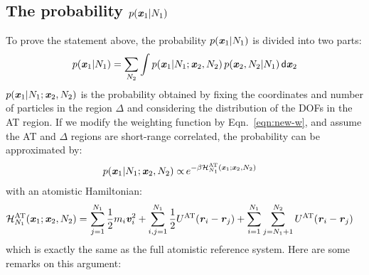 \documentclass[aip,jcp,a4paper,reprint,onecolumn]{revtex4-1}
\newcommand{\vect}[1]{\textbf{\textit{#1}}}
\newcommand{\dd}[1]{\textsf{#1}}
\newcommand{\AT}{{\textrm{{AT}}}}
\newcommand{\HY}{{\Delta}}
\begin{document}
\subsection{The probability $p(\vect x_1 | N_1)$}
To prove the statement above, the probability $p(\vect x_1 | N_1)$ is divided into two parts:
\begin{align}\label{eqn:divide-cond-p}
  p(\vect x_1 | N_1) = \sum_{N_2}\int
  p(\vect x_1 | N_1; \vect x_2, N_2) \,
  p(\vect x_2, N_2 | N_1)
  \,\dd d\vect x_2
\end{align}
$p(\vect x_1 | N_1; \vect x_2, N_2)$ is the probability obtained by fixing the
coordinates and number of particles in the region $\HY$ and considering
the distribution of the DOFs in the AT region.
  If we modify the weighting function by Eqn.~\eqref{eqn:new-w},
and assume the AT and $\HY$ regions are short-range correlated,
the probability can be approximated by:
\begin{align}\label{eqn:p-1-1}
  p(\vect x_1 | N_1; \vect x_2, N_2)
  \propto &\,
  e^{-\beta\mathcal H_{N_1}^{\AT}(\vect x_1; \vect x_2, N_2)}
\end{align}
with an atomistic Hamiltonian:
\begin{align}\label{eqn:p-1-2}
  \mathcal H_{N_1}^{{\AT}}(\vect x_1; \vect x_2, N_2) = &\,
  \sum_{j=1}^{N_1}\frac12 m_i\vect v_i^2 + 
  \sum_{i,j=1}^{N_1}\frac12 U^{{\AT}}(\vect r_i - \vect r_j)  +
  \sum_{i=1}^{N_1}\sum_{j=N_1+1}^{N_2} U^{{\AT}}(\vect r_i - \vect r_j)   
\end{align}
which is exactly the same as the full atomistic reference system.
Here are some remarks on this argument:
\end{document}
